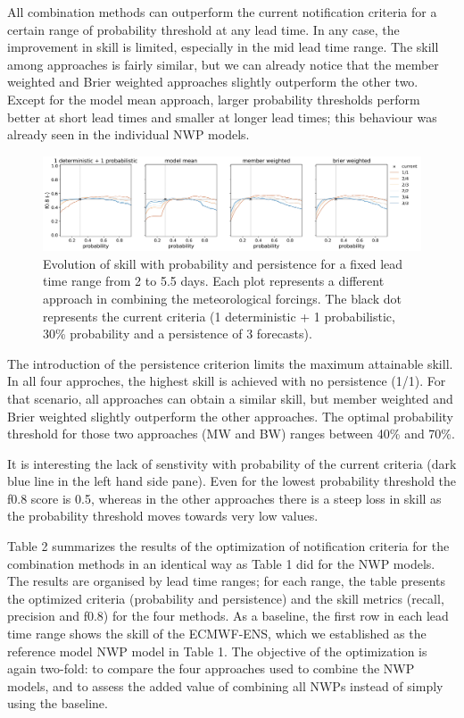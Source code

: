 \documentclass[preprint,12pt]{elsarticle}
\begin{document}
All combination methods can outperform the current notification criteria for a certain range of probability threshold at any lead time. In any case, the improvement in skill is limited, especially in the mid lead time range. The skill among approaches is fairly similar, but we can already notice that the member weighted  and Brier weighted  approaches slightly outperform the other two. Except for the model mean  approach, larger probability thresholds perform better at short lead times and smaller at longer lead times; this behaviour was already seen in the individual NWP models.

\begin{figure}
    \centering
    \includegraphics[width=1\textwidth]{figures/skill_persistence_probability_060h_COMB.jpg}
    \caption{Evolution of skill with probability and persistence for a fixed lead time range from 2 to 5.5 days. Each plot represents a different approach in combining the meteorological forcings. The black dot represents the current criteria (1 deterministic + 1 probabilistic, 30\% probability and a persistence of 3 forecasts).}
    \label{fig:COMB_skill_probability}
\end{figure}

The introduction of the persistence criterion limits the maximum attainable skill. In all four approches, the highest skill is achieved with no persistence (1/1). For that scenario, all approaches can obtain a similar skill, but member weighted and Brier weighted  slightly outperform the other approaches. The optimal probability threshold for those two approaches (MW and BW) ranges between 40\% and 70\%.

It is interesting the lack of senstivity with probability of the current criteria (dark blue line in the left hand side pane). Even for the lowest probability threshold the f0.8 score is 0.5, whereas in the other approaches there is a steep loss in skill as the probability threshold moves towards very low values.

Table 2 summarizes the results of the optimization of notification criteria for the combination methods in an identical way as Table 1 did for the NWP models. The results are organised by lead time ranges; for each range, the table presents the optimized criteria (probability and persistence) and the skill metrics (recall, precision and f0.8) for the four methods. As a baseline, the first row in each lead time range shows the skill of the ECMWF-ENS, which we established as the reference model NWP model in Table 1. The objective of the optimization is again two-fold: to compare the four approaches used to combine the NWP models, and to assess the added value of combining all NWPs instead of simply using the baseline. 
\end{document}
